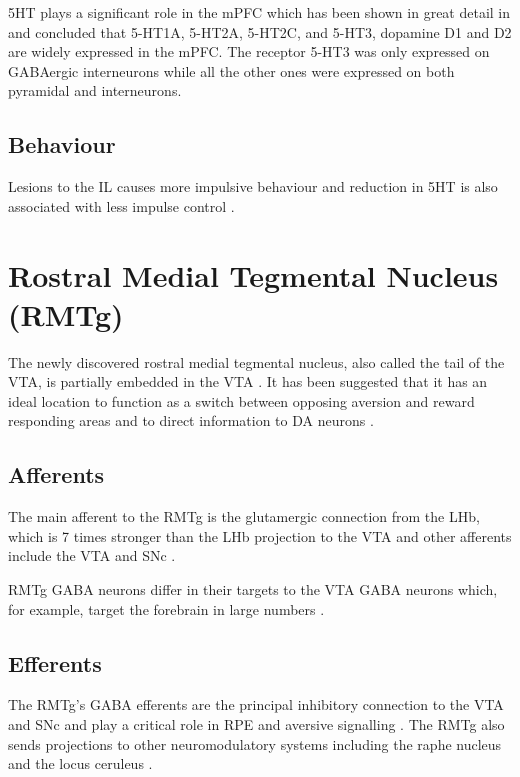 \documentclass[12pt,a4paper]{article}
\begin{document}
5HT plays a significant role in the mPFC which has been shown in great detail in \citep{Santana2017} and concluded that 5-HT1A, 5-HT2A, 5-HT2C, and 5-HT3, 
dopamine D1 and D2 are widely expressed in the mPFC. The receptor 5-HT3 was only expressed on GABAergic interneurons while all the other ones were expressed on both pyramidal and interneurons.


\subsection{Behaviour}
Lesions to the IL causes more impulsive behaviour \citep{Tsutsui-Kimura2016} and reduction in 5HT is also associated with less impulse control \citep{Neufang2016}.



\section{Rostral Medial Tegmental Nucleus (RMTg) }

The newly discovered rostral medial tegmental nucleus, also called the tail of
the VTA, is partially embedded in the VTA \citep{Bourdy2012}. It has been suggested that it has
an ideal location to function as a switch between opposing aversion and reward
responding areas and to direct information to DA neurons \citep{Barrot2012}.

\subsection{Afferents}

The main afferent to the RMTg is the glutamergic connection from the LHb, which is 7 times
stronger than the LHb projection to the VTA \citep{Barrot2012} and other afferents include
the VTA and SNc \citep{Lavezzi2011}.

RMTg GABA neurons differ in their targets to the VTA GABA neurons which, for example, target the forebrain in large numbers \citep{Barrot2012}. 

\subsection{Efferents}

The RMTg’s GABA efferents are the principal inhibitory connection to the VTA and SNc and play a critical role in RPE and aversive signalling \citep{Bourdy2012}. The RMTg also sends projections to other neuromodulatory systems including the raphe nucleus and the locus ceruleus \citep{Barrot2012} \citep{Hong2011}.
\end{document}
